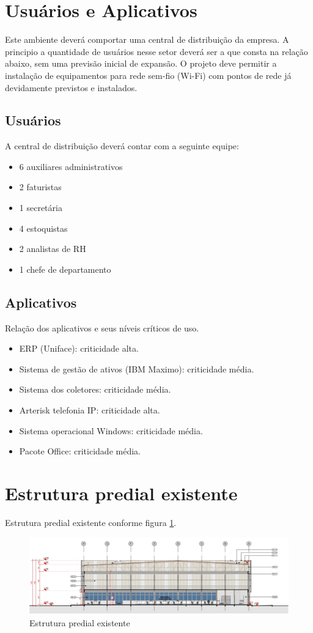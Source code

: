 \documentclass[	DIV=calc,%
							paper=a4,%
							fontsize=12pt,%
							onecolumn]{scrartcl}	 					%
\begin{document}
\section{Usuários e Aplicativos}
Este ambiente deverá comportar uma central de distribuição da empresa. A principio a quantidade de usuários nesse setor deverá ser a que consta na relação abaixo, sem uma previsão inicial de expansão. O projeto deve permitir a instalação de equipamentos para rede sem-fio (Wi-Fi) com pontos de rede já devidamente previstos e instalados. 


\subsection{Usuários}
A central de distribuição deverá contar com a seguinte equipe:
\begin{itemize}
	\item 6 auxiliares administrativos
	\item 2 faturistas
	\item 1 secretária
	\item 4 estoquistas
	\item 2 analistas de RH
	\item 1 chefe de departamento
		
\end{itemize}

\subsection{Aplicativos}
Relação dos aplicativos e seus níveis críticos de uso.
\begin{itemize}
	\item ERP (Uniface): criticidade alta. 
	\item Sistema de gestão de ativos (IBM Maximo): criticidade média.
	\item Sistema dos coletores: criticidade média. 
	\item Arterisk telefonia IP: criticidade alta. 
	\item Sistema operacional Windows: criticidade média.  
	\item Pacote Office: criticidade média. 
\end{itemize}


\section{Estrutura predial existente}
Estrutura predial existente conforme figura \ref{figura1}. 
\begin{figure}
	\centering
	\includegraphics[width=\textwidth]{figura1}
	\caption{Estrutura predial existente}
	\label{figura1}
\end{figure}
\end{document}
